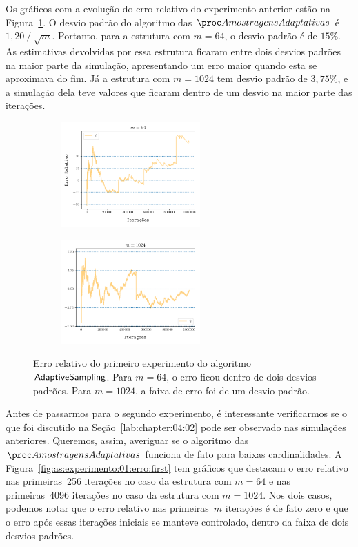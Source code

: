 Os gráficos com a evolução do erro relativo do experimento anterior estão na Figura~\ref{fig:as:experimento:01:erro}.
O desvio padrão do algoritmo das $\asampling$ é $1{,}20 \mathbin{/} \sqrt{m}$. Portanto, para a estrutura com $m = 64$, 
o desvio padrão é de $15\%$. As estimativas devolvidas por essa estrutura ficaram entre dois desvios padrões na maior 
parte da simulação, apresentando um erro maior quando esta se aproximava do fim. Já a estrutura com $m = 1024$ tem 
desvio padrão de $3{,}75\%$, e a simulação dela teve valores que ficaram dentro de um desvio na maior parte das 
iterações.

\begin{figure}
  \centering
  \begin{subfigure}{.5\textwidth}
    \centering
    \includegraphics[width=\linewidth, height=4cm]{figuras/adaptive_sampling_erro_full_64.png}
  \end{subfigure}%
  \begin{subfigure}{.5\textwidth}
    \centering
    \includegraphics[width=\linewidth, height=4cm]{figuras/adaptive_sampling_erro_full_1024.png}
  \end{subfigure}
  \caption{Erro relativo do primeiro experimento do algoritmo $\textsf{AdaptiveSampling}$. Para $m = 64$, o erro ficou dentro de dois desvios
  padrões. Para $m = 1024$, a faixa de erro foi de um desvio padrão.}
  \label{fig:as:experimento:01:erro}
\end{figure}

Antes de passarmos para o segundo experimento, é interessante verificarmos se o que foi discutido na 
Seção~\ref{lab:chapter:04:02} pode ser observado nas simulações anteriores. Queremos, assim, averiguar se o algoritmo 
das~$\asampling$ funciona de fato para baixas cardinalidades. A Figura~\ref{fig:as:experimento:01:erro:first} tem
gráficos que destacam o erro relativo nas primeiras~256 iterações no caso da estrutura com $m = 64$ e nas primeiras~4096
iterações no caso da estrutura com $m = 1024$. Nos dois casos, podemos notar que o erro relativo nas primeiras~$m$ 
iterações é de fato zero e que o erro após essas iterações iniciais se manteve controlado, dentro da faixa de dois 
desvios padrões.

